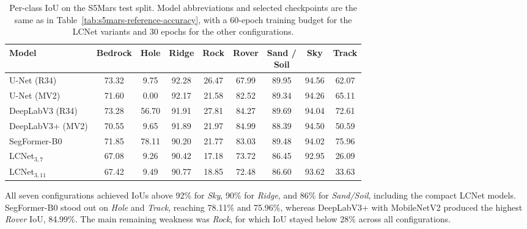 \begin{table}[ht!]
    \centering
    \small
    \setlength{\tabcolsep}{3pt}
    \begin{tabular}{@{}l c c c c c c c c@{}}
        \toprule
        \textbf{Model}                              & \textbf{Bedrock} & \textbf{Hole}  &
        \textbf{Ridge}                              & \textbf{Rock}    & \textbf{Rover} &
        \shortstack{\textbf{Sand /}\\\textbf{Soil}} & \textbf{Sky}     & \textbf{Track}                                                 \\
        \midrule
        \midrule
        U-Net (R34)                                 & 73.32            & 9.75           & 92.28 & 26.47 & 67.99 & 89.95 & 94.56 & 62.07 \\
        U-Net (MV2)                                 & 71.60            & 0.00           & 92.17 & 21.58 & 82.52 & 89.34 & 94.26 & 65.11 \\
        DeepLabV3 (R34)                             & 73.28            & 56.70          & 91.91 & 27.81 & 84.27 & 89.69 & 94.04 & 72.61 \\
        DeepLabV3+ (MV2)                            & 70.55            & 9.65           & 91.89 & 21.97 & 84.99 & 88.39 & 94.50 & 50.59 \\
        SegFormer-B0                                & 71.85            & 78.11          & 90.20 & 21.77 & 83.03 & 89.48 & 94.02 & 75.96 \\
        \midrule
        LCNet\(_{3,7}\)                             & 67.08            & 9.26           & 90.42 & 17.18 & 73.72 & 86.45 & 92.95 & 26.09 \\
        LCNet\(_{3,11}\)                            & 67.42            & 9.49           & 90.77 & 18.85 & 72.48 & 86.60 & 93.62 & 33.63 \\
        \bottomrule
    \end{tabular}
    \vspace{5mm}
    \caption{Per-class IoU on the S5Mars test split. Model abbreviations and selected checkpoints are the same as in Table~\ref{tab:s5mars-reference-accuracy}, with a 60-epoch training budget for the LCNet variants and 30 epochs for the other configurations.}
    \label{tab:s5mars-per-class-iou}
\end{table}
All seven configurations achieved IoUs above 92\% for \emph{Sky}, 90\% for \emph{Ridge}, and 86\% for \emph{Sand/Soil}, including the compact LCNet models. SegFormer-B0 stood out on \emph{Hole} and \emph{Track}, reaching 78.11\% and 75.96\%, whereas DeepLabV3+ with MobileNetV2 produced the highest \emph{Rover} IoU, 84.99\%. The main remaining weakness was \emph{Rock}, for which IoU stayed below 28\% across all configurations.

